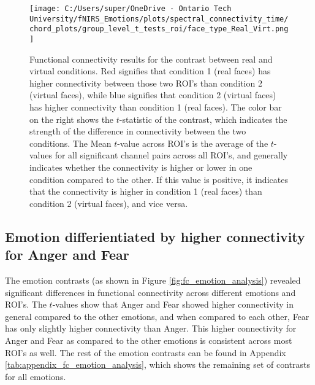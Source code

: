 \begin{figure}[H]
  \centering
  \texttt{[image: C:/Users/super/OneDrive - Ontario Tech University/fNIRS\_Emotions/plots/spectral\_connectivity\_time/chord\_plots/group\_level\_t\_tests\_roi/face\_type\_Real\_Virt.png]}
  \caption[FC: Real vs. Virtual]{Functional connectivity results for the contrast between real and virtual conditions.
  Red signifies that condition 1 (real faces) has higher connectivity between those two ROI's than condition 2 (virtual faces), while blue signifies that condition 2 (virtual faces) has higher connectivity than condition 1 (real faces).
  The color bar on the right shows the $t$-statistic of the contrast, which indicates the strength of the difference in connectivity between the two conditions.
  The Mean $t$-value across ROI's is the average of the $t$-values for all significant channel pairs across all ROI's, and generally indicates whether the connectivity is higher or lower in one condition compared to the other.
  If this value is positive, it indicates that the connectivity is higher in condition 1 (real faces) than condition 2 (virtual faces), and vice versa.}
  \label{fig:fc_real_vs_virtual}
\end{figure}

\subsection{Emotion differientiated by higher connectivity for Anger and Fear}

The emotion contrasts (as shown in Figure \ref{fig:fc_emotion_analysis}) revealed significant differences in functional connectivity across different emotions and ROI's.
The $t$-values show that Anger and Fear showed higher connectivity in general compared to the other emotions, and when compared to each other, Fear has only slightly higher connectivity than Anger. 
This higher connectivity for Anger and Fear as compared to the other emotions is consistent across most ROI's as well. 
The rest of the emotion contrasts can be found in Appendix \ref{tab:appendix_fc_emotion_analysis}, which shows the remaining set of contrasts for all emotions.


